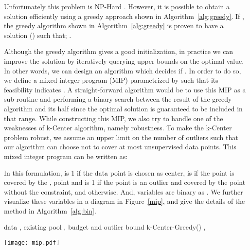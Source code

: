 \documentclass{article} \usepackage{iclr2018_conference,times}
\begin{document}
Unfortunately this problem is NP-Hard \citep{cook}. However, it is possible to obtain a  solution efficiently
using a greedy approach shown in  Algorithm~\ref{alg:greedy}. If , the greedy algorithm shown in
Algorithm~\ref{alg:greedy} is proven to have a solution () such that; .


Although the greedy algorithm gives a good initialization, in practice we can improve the  solution by
iteratively querying upper bounds on the optimal value. In other words, we can design an algorithm which decides if . In order to do so, we define a mixed integer program (MIP) parametrized by  such that its
feasibility indicates . A straight-forward algorithm would be to use this MIP as a sub-routine and
performing a binary search between the result of the greedy algorithm and its half since the optimal solution is
guaranteed to be included in that range. While constructing this MIP, we also try to handle one of the weaknesses of
k-Center algorithm, namely robustness. To make the k-Center problem robust, we assume an upper limit on the number of
outliers  such that our algorithm can choose not to cover at most  unsupervised data points. This mixed
integer program can be written as:




In this formulation,  is 1 if the  data point is chosen as center,  is  if the 
point is covered by the , point and  is 1 if the  point is an outlier and covered by the
 point without the  constraint, and  otherwise. And, variables are binary as . We further visualize these variables in a diagram in Figure~\ref{mip}, and give the details of
the method in Algorithm~\ref{alg:bin}. 

\begin{figure*}[h]
    \begin{minipage}[t]{0.5\textwidth}
    \vspace{-3mm} 
    \begin{algorithm}[H]
        \caption{Robust k-Center} 
        \label{alg:bin} 
        \begin{algorithmic} 
         data ,
            existing pool , budget  and outlier bound  
           k-Center-Greedy() 
            \STATE  
            \STATE , 
            \REPEAT \IF {} 
            \STATE  
            \ELSE 
            \STATE
         
        \ENDIF 
        \UNTIL{} 
\end{algorithmic} 
\end{algorithm}
\end{minipage} \quad
\begin{minipage}[t]{0.45\textwidth}
\vspace{-1mm}
\texttt{[image: mip.pdf]}
\vspace{-5mm}
\caption{Visualizations of the variables. In this solution, the  node is chosen as a center and nodes  are in a  ball around it. The  node is marked as an outlier.} \label{mip}  
\end{minipage}
\end{figure*}
\end{document}
